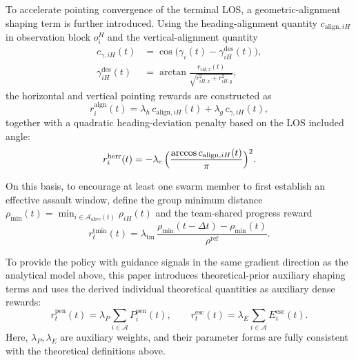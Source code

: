 \documentclass{cja}
\begin{document}
To accelerate pointing convergence of the terminal LOS, a geometric-alignment shaping term is further introduced. Using the heading-alignment quantity $c_{\mathrm{align},iH}$ in observation block $o_i^{H}$ and the vertical-alignment quantity
\begin{equation}
\begin{aligned}
c_{\gamma,iH}(t)
&=\cos\!\bigl(\gamma_i(t)-\gamma_{iH}^{\mathrm{des}}(t)\bigr),\\
\gamma_{iH}^{\mathrm{des}}(t)
&=\arctan\!\frac{r_{iH,z}(t)}{\sqrt{r_{iH,x}^{2}+r_{iH,y}^{2}}},
\end{aligned}
\end{equation}
the horizontal and vertical pointing rewards are constructed as
\begin{equation}
r_i^{\mathrm{algn}}(t)=\lambda_h\,c_{\mathrm{align},iH}(t)+\lambda_g\,c_{\gamma,iH}(t),
\label{eq:r-align}
\end{equation}
together with a quadratic heading-deviation penalty based on the LOS included angle:
\begin{equation}
r_i^{\mathrm{herr}}(t)=-\lambda_e\,\Bigl(\dfrac{\arccos c_{\mathrm{align},iH}(t)}{\pi}\Bigr)^{2}.
\label{eq:r-herr}
\end{equation}

On this basis, to encourage at least one swarm member to first establish an effective assault window, define the group minimum distance $\rho_{\min}(t)=\min_{i\in\mathcal{A}_{\mathrm{alive}}(t)}\rho_{iH}(t)$ and the team-shared progress reward
\begin{equation}
r_t^{\mathrm{tmin}}(t)=\lambda_{\mathrm{tm}}\,\frac{\rho_{\min}(t-\Delta t)-\rho_{\min}(t)}{\rho^{\mathrm{ref}}}.
\label{eq:r-team}
\end{equation}

To provide the policy with guidance signals in the same gradient direction as the analytical model above, this paper introduces theoretical-prior auxiliary shaping terms and uses the derived individual theoretical quantities as auxiliary dense rewards:
\begin{equation}
r_t^{\mathrm{pen}}(t)=\lambda_P\sum_{i\in\mathcal{A}}P_i^{\mathrm{pen}}(t),\qquad
r_t^{\mathrm{esc}}(t)=\lambda_E\sum_{i\in\mathcal{A}}E_i^{\mathrm{esc}}(t).
\label{eq:r-prior}
\end{equation}
Here, $\lambda_P,\lambda_E$ are auxiliary weights, and their parameter forms are fully consistent with the theoretical definitions above.
\end{document}
